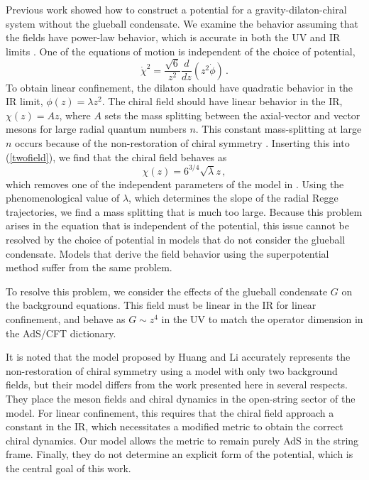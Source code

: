 \documentclass[aps,prd,12pt,nofootinbib]{revtex4}
\newcommand{\be}{\begin{equation}}
\newcommand{\ee}{\end{equation}}
\def\Dz{\frac{d}{dz}}
\def\phidot{\dot{\phi}}
\def\chidot{\dot{\chi}}
\def\rt6{\sqrt{6}}
\begin{document}
Previous work showed how to construct a potential for a gravity-dilaton-chiral system without the glueball condensate. 
We examine the behavior assuming that the fields have power-law behavior, which is accurate in both the UV and IR limits \cite{Springer2010}. 
One of the equations of motion is independent of the choice of potential,
\be
\chidot^2  = \frac{\rt6}{z^2} \Dz(z^2\phidot) \, . 
\label{twofield}
\ee
To obtain linear confinement, the dilaton should have quadratic behavior in the IR limit, $\phi(z)=\lambda z^2$.
The chiral field should have linear behavior in the IR, $\chi(z)=A z$, where $A$ sets the mass splitting between the axial-vector and vector mesons for large radial quantum numbers $n$. 
This constant mass-splitting at large $n$ occurs because of the non-restoration of chiral symmetry \cite{Shifman-2008}.
Inserting this into (\ref{twofield}), we find that the chiral field behaves as
\be
\chi(z)=6^{3/4}\sqrt{\lambda}z \, ,
\ee
which removes one of the independent parameters of the model in \cite{gherghetta-kelley}. 
Using the phenomenological value of $\lambda$, which determines the slope of the radial Regge trajectories, we find a mass splitting that is much too large.
Because this problem arises in the equation that is independent of the potential, this issue cannot be resolved by the choice of potential in models that do not consider the glueball condensate. 
Models that derive the field behavior using the superpotential method suffer from the same problem.

To resolve this problem, we consider the effects of the glueball condensate $G$ on the background equations. 
This field must be linear in the IR for linear confinement, and behave as $G \sim z^4$ in the UV to match the operator dimension in the AdS/CFT dictionary.

It is noted that the model proposed by Huang and Li \cite{Li2013, Li2013a} accurately represents the non-restoration of chiral symmetry using a model with only two background fields, but their model differs from the work presented here in several respects.
They place the meson fields and chiral dynamics in the open-string sector of the model. 
For linear confinement, this requires that the chiral field approach a constant in the IR, which necessitates a modified metric to obtain the correct chiral dynamics.
Our model allows the metric to remain purely AdS in the string frame.
Finally, they do not determine an explicit form of the potential, which is the central goal of this work.

\end{document}
